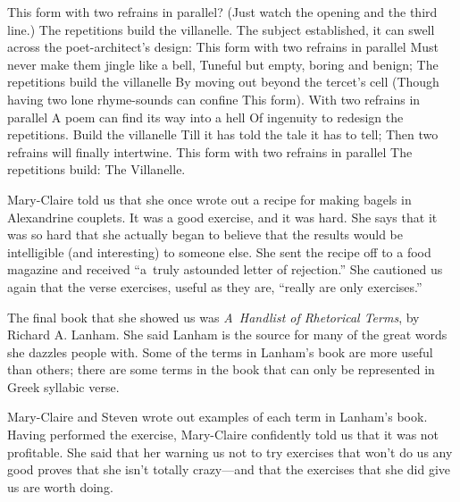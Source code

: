 \smallskip
{\obeylines\parskip=0pt
\qquad\qquad\qquad This form with two refrains in parallel?
\qquad\qquad\qquad (Just watch the opening and the third line.)
\qquad\qquad\qquad The repetitions build the villanelle.
\smallskip
\qquad\qquad\qquad The subject established, it can swell
\qquad\qquad\qquad across the poet-architect's design:
\qquad\qquad\qquad This form with two refrains in parallel
\smallskip
\qquad\qquad\qquad Must never make them jingle like a bell,
\qquad\qquad\qquad Tuneful but empty, boring and benign;
\qquad\qquad\qquad The repetitions build the villanelle
\smallskip
\qquad\qquad\qquad By moving out beyond the tercet's cell
\qquad\qquad\qquad (Though having two lone rhyme-sounds can confine
\qquad\qquad\qquad This form).  With two refrains in parallel
\smallskip
\qquad\qquad\qquad A poem can find its way into a hell
\qquad\qquad\qquad Of ingenuity to redesign
\qquad\qquad\qquad the repetitions.  Build the villanelle
\smallskip
\qquad\qquad\qquad Till it has told the tale it has to tell;
\qquad\qquad\qquad Then two refrains will finally intertwine.
\qquad\qquad\qquad This form with two refrains in parallel
\qquad\qquad\qquad The repetitions build: The Villanelle.
}  
                                                                               
\smallskip
Mary-Claire told us that she once wrote out a recipe for making bagels in
Alexandrine couplets.  It was a good exercise, and it was hard.
She says that it was so hard that she actually began to believe that the
results would be intelligible (and interesting) to someone else.  She sent
the recipe off to a food magazine and received ``a~truly astounded letter
of rejection.''  She cautioned us again that the verse exercises, useful as
they are, ``really are only exercises.''

The final book that she showed us was {\sl A~Handlist of Rhetorical Terms}, by
Richard A. Lanham.  She said Lanham is the source for many of the great
words she dazzles people with.  Some of the terms in Lanham's book are
more useful than others; there are some terms in the book that can only be
represented in Greek syllabic verse.

Mary-Claire and Steven wrote out examples of each term 
in Lanham's book.   Having performed
the exercise, Mary-Claire confidently told us that it was not profitable.
She said that her warning us not to try exercises that won't do us any
good proves that she isn't totally crazy---and that the exercises that she
did give us are worth doing.

